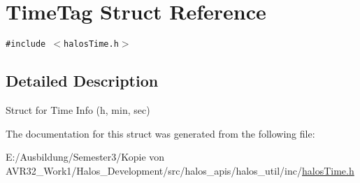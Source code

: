 \hypertarget{struct_time_tag}{
\section{TimeTag Struct Reference}
\label{struct_time_tag}
}
{\tt \#include $<$halosTime.h$>$}



\subsection{Detailed Description}
Struct for Time Info (h, min, sec) 

The documentation for this struct was generated from the following file:\begin{CompactItemize}
\item 
E:/Ausbildung/Semester3/Kopie von AVR32\_\-Work1/Halos\_\-Development/src/halos\_\-apis/halos\_\-util/inc/\hyperlink{halos_time_8h}{halosTime.h}\end{CompactItemize}
